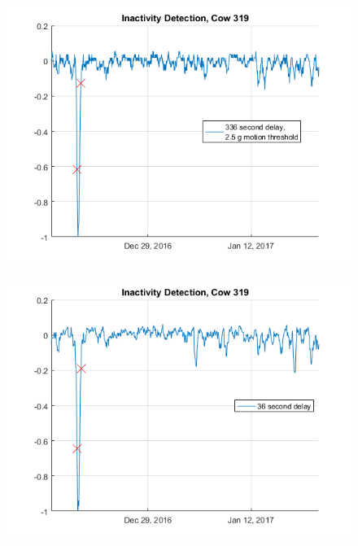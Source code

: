 \begin{figure}[h]
\centering
\includegraphics[width = 0.75 \textwidth]{figures/InactivityDetectionCow319_336period2_5threshold.png}
\caption{}
\label{}
\end{figure}

\begin{figure}[h]
\centering
\includegraphics[width = 0.75 \textwidth]{figures/InactivityDetectionCow319_36period.png}
\caption{}
\label{}
\end{figure}




